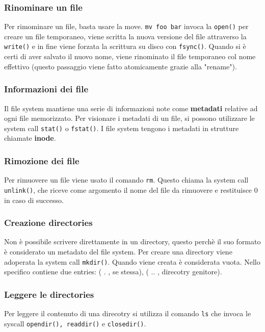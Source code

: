 \documentclass[12pt, twoside, letterpaper]{article}
\begin{document}
			\subsubsection{Rinominare un file}
				Per rimominare un file, basta usare la move. \texttt{mv foo bar} invoca la \texttt{open()} per creare un file temporaneo, viene scritta la nuova versione del file attraverso la \texttt{write()} e in fine viene forzata la scrittura su disco con \texttt{fsync()}. Quando si è certi di aver salvato il nuovo nome, viene rinominato il file temporaneo col nome effettivo (questo passaggio viene fatto atomicamente grazie alla "rename").
				
			\subsubsection{Informazioni dei file}
				Il file system mantiene una serie di  informazioni note come \textbf{metadati} relative ad ogni file memorizzato. Per visionare i metadati di un file, si possono utilizzare le system call \texttt{stat()} o \texttt{fstat()}. I file system tengono i metadati in strutture chiamate \textbf{inode}. 
				
			\subsubsection{Rimozione dei file}
				Per rimuovere un file viene usato il comando \texttt{rm}. Questo chiama la system call \texttt{unlink()}, che riceve come argomento il nome del file da rimuovere e restituisce 0 in caso di successo. 
				
			\subsubsection{Creazione directories}
				Non è possibile scrivere direttamente in un directory, questo perchè il suo formato è considerato un metadato del file system. Per creare una directory viene adoperata la system call \texttt{mkdir()}. Quando viene creata è considerata vuota. Nello specifico contiene due entries: ( . , se stessa), ( .. , direcotry genitore).
				
			\subsubsection{Leggere le directories}
				Per leggere il contenuto di una direcotry si utilizza il comando \texttt{ls} che invoca le syscall \texttt{opendir(), readdir()} e \texttt{closedir()}.
				
\end{document}
